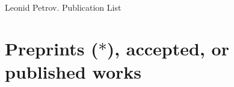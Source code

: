 \documentclass[letterpaper,11pt]{article}
\begin{document}
{\huge Leonid Petrov. Publication List}

\bigskip
\bigskip

\section*{Preprints ($*$), accepted, or published works}


\end{document}
